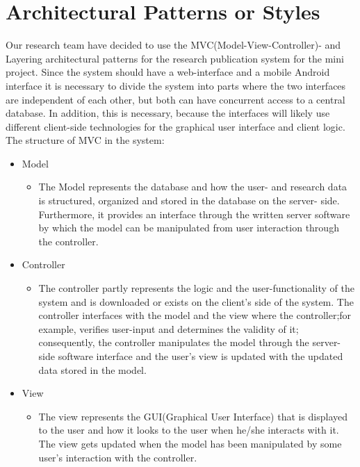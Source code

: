 \documentclass[a4paper,12pt]{article}
\begin{document}
\section{Architectural Patterns or Styles}
	Our research team have decided to use the MVC(Model-View-Controller)- and
	Layering architectural patterns for the research publication system for the mini
	project. Since the system should have a web-interface and a mobile Android interface
	it is necessary to divide the system into parts where the two interfaces are independent
	of each other, but both can have concurrent access to a central database. In addition,
	this is necessary, because the interfaces will likely use different client-side
	technologies for the graphical user interface and client logic.
	\newline
	\newline
	The structure of MVC in the system:
	\begin{itemize}
		\item Model
		\begin{itemize}
			\item[] The Model represents the database and how the user- and research
			data is structured, organized and stored in the database on the server-
			side. Furthermore, it provides an interface through the written server
			software by which the model can be manipulated from user interaction
			through the controller.
		\end{itemize}
		\item Controller
		\begin{itemize}
			\item[] The controller partly represents the logic and the user-functionality
			of the system and is downloaded or exists on the client's side of the
			system. The controller interfaces with the model and the view
			where the controller;for example, verifies user-input and determines the validity
			of it; consequently, the controller manipulates the model through
			the server-side software interface and the user's view is updated
			with the updated data stored in the model.
		\end{itemize}
		\item View
		\begin{itemize}
			\item[] The view represents the GUI(Graphical User Interface) that is displayed
			to the user and how it looks to the user when he/she interacts with it.
			The view gets updated when the model has been manipulated by some user's
			interaction with the controller.
		\end{itemize}
	\end{itemize}
\end{document}
